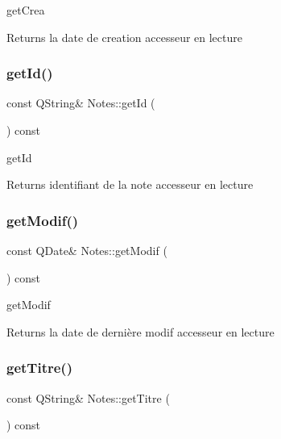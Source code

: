 get\+Crea 

\begin{DoxyReturn}{Returns}
la date de creation accesseur en lecture 
\end{DoxyReturn}
\mbox{\label{class_notes_a034e1fb763f1535b245fed61f2c07eaa}} 
\subsubsection{\texorpdfstring{get\+Id()}{getId()}}
{\footnotesize\ttfamily const Q\+String\& Notes\+::get\+Id (\begin{DoxyParamCaption}{ }\end{DoxyParamCaption}) const\hspace{0.3cm}{\ttfamily [inline]}}



get\+Id 

\begin{DoxyReturn}{Returns}
identifiant de la note accesseur en lecture 
\end{DoxyReturn}
\mbox{\label{class_notes_ae375538696f0a9c0cbe446900d3eaf6e}} 
\subsubsection{\texorpdfstring{get\+Modif()}{getModif()}}
{\footnotesize\ttfamily const Q\+Date\& Notes\+::get\+Modif (\begin{DoxyParamCaption}{ }\end{DoxyParamCaption}) const\hspace{0.3cm}{\ttfamily [inline]}}



get\+Modif 

\begin{DoxyReturn}{Returns}
la date de dernière modif accesseur en lecture 
\end{DoxyReturn}
\mbox{\label{class_notes_ad62548dca78862addfbe7c8a0b797c82}} 
\subsubsection{\texorpdfstring{get\+Titre()}{getTitre()}}
{\footnotesize\ttfamily const Q\+String\& Notes\+::get\+Titre (\begin{DoxyParamCaption}{ }\end{DoxyParamCaption}) const\hspace{0.3cm}{\ttfamily [inline]}}



